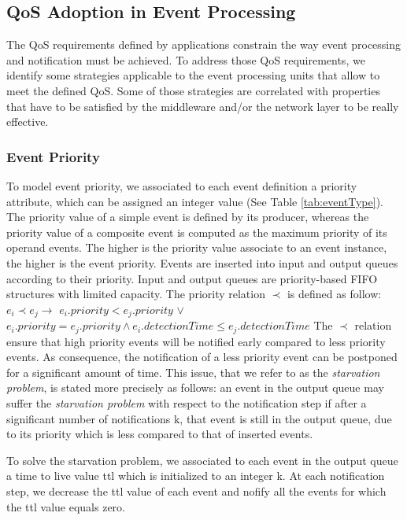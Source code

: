 \documentclass[a4paper,twoside]{article}
\begin{document}
\subsection{QoS Adoption in Event Processing}
\label{sec:qos_adoption} 
The QoS requirements defined by applications constrain the way event processing and notification must be achieved. To address those
QoS requirements, we identify some strategies applicable to the event processing units that allow to meet the defined QoS. Some of those strategies are correlated with properties that have to be satisfied by the middleware and/or the network layer to be really effective.

\subsubsection{Event Priority}
To model event priority, we associated to each event definition a priority attribute, which can be assigned an integer value (See Table \ref{tab:eventType}). The priority value of a simple event is defined by its producer, whereas the priority value of a composite event is computed as the maximum priority of its operand events. The higher is the priority value associate to an event instance, the higher is the event priority. Events are inserted into input and output queues according to their priority. Input and output queues are priority-based FIFO structures with limited capacity. The priority relation $\prec$ is defined as follow: \newline
$e_i \prec e_j \rightarrow$ \newline
$e_i .priority < e_{j}.priority$  $\vee$    \newline
$e_i .priority = e_{j}.priority \wedge e_i.detectionTime \leq e_j.detectionTime$ \newline
The $\prec$ relation ensure that high priority events will be notified early compared to less priority events. As consequence, the notification of a less priority event can be postponed for a significant amount of time. This issue, that we refer to as the \textit{starvation problem}, is stated more precisely as follows:
an event in the output queue may suffer the \textit{starvation problem} with respect to the notification step if after a significant number of notifications k, that event is still in the output queue, due to its priority which is less compared to that of inserted events. 

To solve the starvation problem, we associated to each event in the output queue a time to live value ttl which is initialized to an integer k. At each notification step, we decrease the ttl value of each event and nofify all the events for which the ttl value equals zero. 
\end{document}

